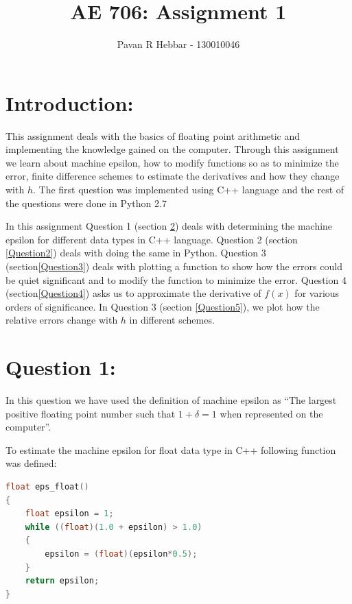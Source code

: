 \documentclass[11pt, a4paper]{article}
\title{\textbf{AE 706: Assignment 1}}
\author{Pavan R Hebbar - 130010046}
\begin{document}
\maketitle
\newpage
\tableofcontents
\newpage
\section{Introduction:}
This assignment deals with the basics of floating point arithmetic and implementing the knowledge gained on the computer. Through 
this assignment we learn about machine epsilon, how to modify functions so as to minimize the error, finite difference schemes
 to estimate the derivatives and how they change with $h$. The first question was implemented using C++ language and the rest of 
the questions were done in Python 2.7

In this assignment Question 1 (section \ref{Question1}) deals with determining the machine epsilon for different data types in C++ language. 
Question 2 (section \ref{Question2}) deals with doing the same in Python. Question 3 (section\ref{Question3}) deals with plotting a function to show how the errors could be
quiet significant and to modify the function to minimize the error. Question 4 (section\ref{Question4}) asks us to approximate the derivative of 
$f(x)$ for various orders of significance. In Question 3 (section \ref{Question5}), we plot how the relative errors change with $h$ in different 
schemes.

\section{Question 1:}
\label{Question1}

In this question we have used the definition of machine epsilon as ``The largest positive floating point number such that $1 
+ \delta = 1$ when represented on the computer''.

To estimate the machine epsilon for float data type in C++ following function was defined:
\begin{lstlisting}[language = C++, caption = Function to determine epsilon for float]
float eps_float()
{
    float epsilon = 1;
    while ((float)(1.0 + epsilon) > 1.0)
    {
        epsilon = (float)(epsilon*0.5);
    }
    return epsilon;
}
\end{lstlisting}
\end{document}
